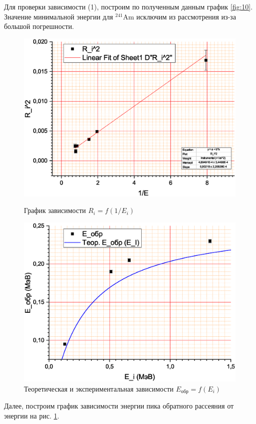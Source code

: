 \documentclass[a4paper]{article}
\newcommand{\isotope}[2]{$ ^{#2}\mathrm{#1} $}
\begin{document}
Для проверки зависимости (1), построим по полученным данным график \ref{fig:10}. Значение минимальной энергии для \isotope{Am}{241} исключим из рассмотрения из-за большой погрешности.
\begin{figure}
	\centering
	\begin{minipage}{0.49\linewidth}
		\centering
		\includegraphics[width=0.9\linewidth]{Graph15}
		\caption{График зависимости $R_i = f (1/E_i)$}
		\label{fig:10}
	\end{minipage}
	\begin{minipage}{0.49\linewidth}
		\centering
		\includegraphics[width=0.9\linewidth]{Graph17}
		\caption{Теоретическая и экспериментальная зависимости $E_{обр} = f (E_i)$}
		\label{fig:last}
	\end{minipage}
\end{figure}

Далее, построим график зависимости энергии пика обратного рассеяния от энергии на рис. \ref{fig:last}.
\end{document}
